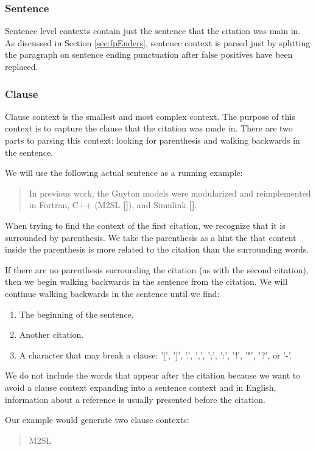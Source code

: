 \documentclass[10pt, conference, compsocconf]{IEEEtran}
\begin{document}
\subsubsection{Sentence}
Sentence level contexts contain just the sentence that the citation was main in. As discussed in Section \ref{sec:fpEnders},
sentence context is parsed just by splitting the paragraph on sentence ending punctuation after false positives have been replaced.

\subsubsection{Clause}
Clause context is the smallest and most complex context. The purpose of this context is to capture the clause that the citation was made in.
There are two parts to parsing this context: looking for parenthesis and walking backwards in the sentence.

We will use the following actual sentence as a running example:
\begin{quote}
In previous work, the Guyton models were modularized and reimplemented in Fortran, C++ (M2SL \textbf{[]}), and Simulink \textbf{[]}.
\end{quote}

When trying to find the context of the first citation, we recognize that it is surrounded by parenthesis.
We take the parenthesis as a hint the that content inside the parenthesis is more related to the citation than the surrounding words.

If there are no parenthesis surrounding the citation (as with the second citation), then we begin walking backwards in the sentence from the citation.
We will continue walking backwards in the sentence until we find:
\begin{enumerate}
   \item The beginning of the sentence.
   \item Another citation.
   \item A character that may break a clause: '[', ']', '.', ',', ';', ':', '!', '"', '?', or '-'.
\end{enumerate}

We do not include the words that appear after the citation because we want to avoid a clause context expanding into a sentence context and
in English, information about a reference is usually presented before the citation.

Our example would generate two clause contexts:
\begin{quote}
M2SL
\end{quote}
\end{document}
